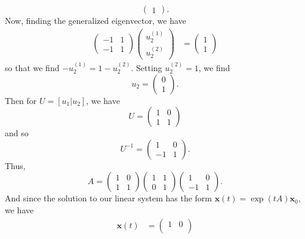 \documentclass{article}
\begin{document}
\begin{itemize}
\begin{itemize}
\[\begin{pmatrix}
            1
        \end{pmatrix}.\]
        Now, finding the generalized eigenvector, we have 
        \begin{align*}
            \begin{pmatrix}
                -1 & 1\\
                -1 & 1
            \end{pmatrix}\begin{pmatrix}
                u_2^{(1)}\\
                u_2^{(2)}
            \end{pmatrix} &= \begin{pmatrix}
                1\\
                1
            \end{pmatrix}
        \end{align*}
        so that we find $-u_2^{(1)} = 1 - u_2^{(2)}$. Setting $u_2^{(2)} = 1$, we find
        \[u_2 = \begin{pmatrix}
            0\\
            1
        \end{pmatrix}.\]
        Then for $U = [u_1|u_2]$, we have
        \[U = \begin{pmatrix}
            1 & 0\\
            1 & 1
        \end{pmatrix}\]
        and so
        \[U^{-1} = \begin{pmatrix}
            1 & 0\\
            -1 & 1
        \end{pmatrix}.\]
        Thus,
        \[A = \begin{pmatrix}
            1 & 0\\
            1 & 1
        \end{pmatrix}\begin{pmatrix}
            1 & 1\\
            0 & 1
        \end{pmatrix}\begin{pmatrix}
            1 & 0\\
            -1 & 1
        \end{pmatrix}.\]
        And since the solution to our linear system has the form $\mathbf{x}(t) = \exp(tA)\mathbf{x}_0$, we have
        \begin{align*}
            \mathbf{x}(t) &= \begin{pmatrix}
                1 & 0\\

\end{pmatrix}
\end{align*}
\end{itemize}
\end{itemize}
\end{document}
